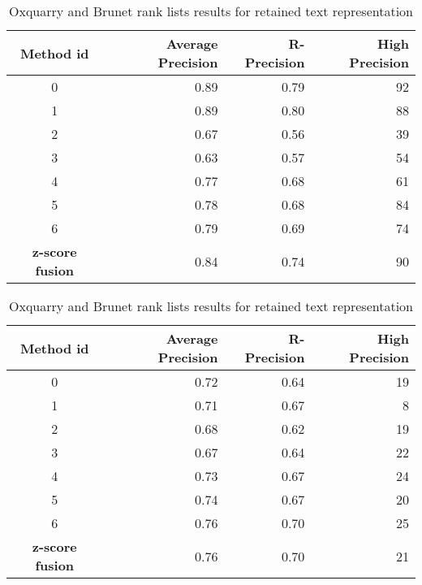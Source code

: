\begin{table}[H]
  \centering
  \caption{Oxquarry and Brunet rank lists results for retained text representation}
  \label{tab:9rl_results_brunet_oxquarry}

  \begin{tabular}{c r r r}
    \toprule
    Method id &
    Average Precision &
    R-Precision &
    High Precision \\
    \midrule
    0 & 0.89 & 0.79 & 92 \\
    1 & 0.89 & 0.80 & 88 \\
    2 & 0.67 & 0.56 & 39 \\
    3 & 0.63 & 0.57 & 54 \\
    4 & 0.77 & 0.68 & 61 \\
    5 & 0.78 & 0.68 & 84 \\
    6 & 0.79 & 0.69 & 74 \\
    \textbf{z-score fusion} &  0.84 & 0.74 & 90 \\
    \bottomrule
  \end{tabular}

  \vspace{0.5cm}

  \begin{tabular}{c r r r}
    \toprule
    Method id &
    Average Precision &
    R-Precision &
    High Precision \\
    \midrule
    0 & 0.72 & 0.64 & 19 \\
    1 & 0.71 & 0.67 &  8 \\
    2 & 0.68 & 0.62 & 19 \\
    3 & 0.67 & 0.64 & 22 \\
    4 & 0.73 & 0.67 & 24 \\
    5 & 0.74 & 0.67 & 20 \\
    6 & 0.76 & 0.70 & 25 \\
    \textbf{z-score fusion} & 0.76 &  0.70 & 21 \\
    \bottomrule
  \end{tabular}

\end{table}



